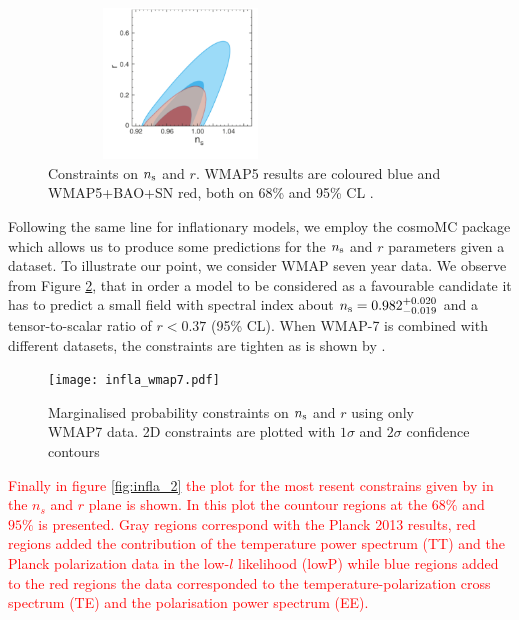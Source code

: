 \documentclass{rmaa}
\begin{document}
\begin{figure}[h!]
\begin{center}
 \includegraphics[trim = 1mm 10mm -10mm -3mm, clip, width=7cm, height=4cm]{komatsu1.pdf}
\caption{Constraints on $n_{\rm s}$ and $r$.
WMAP5 results are coloured blue and WMAP5+BAO+SN red, both on 68\% and 95\% CL \citep{Komatsu}.
}\label{fig:Komatsu}
\end{center}
\end{figure}

Following the same line for inflationary models, we employ the {\sc cosmoMC} package \citep{Lewis}
which allows us to produce some predictions for the $n_{\rm s}$ and $r$ parameters given 
a dataset. To illustrate our point, we consider WMAP seven year data. 
We observe from Figure \ref{fig:infla}, that in order a 
model to be considered as a favourable candidate 
it has to predict a small field with spectral index about  $n_{\rm s}=0.982^{+0.020}_{-0.019}$ 
 and a tensor-to-scalar ratio of $r<0.37$ (95\% CL).
When WMAP-7 is combined with different datasets, the constraints are tighten as is 
shown by \citep{Larson}. 



\begin{figure}[h!]
\begin{center}
 \texttt{[image: infla\_wmap7.pdf]}
\caption{Marginalised probability constraints on $n_{\rm s}$ and $r$ using only WMAP7 data. 
2D constraints are plotted with $1\sigma$ and
$2\sigma$ confidence contours
}\label{fig:infla}
\end{center}
\end{figure}	

\textcolor{red}{Finally in figure \ref{fig:infla_2} the plot for the most resent constrains given by \citep{PlanckC} in the $n_s$ and $r$ plane is shown. In this plot the countour regions at the $68\%$ and $95\%$ is presented. Gray regions correspond with the Planck 2013 results, red regions added the contribution of the temperature power spectrum (TT) and the Planck polarization data in the low-$l$ likelihood (lowP) while blue regions added to the red regions the data corresponded to the temperature-polarization cross spectrum (TE) and the polarisation power spectrum (EE).}
\end{document}
